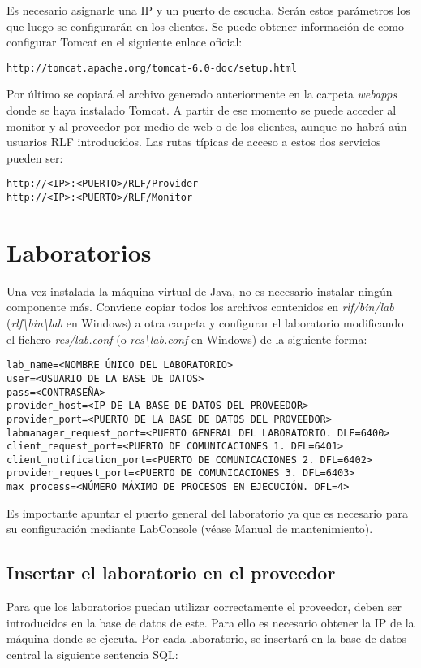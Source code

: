 Es necesario asignarle una IP y un puerto de escucha. Serán estos 
parámetros los que luego se configurarán en los clientes. Se puede 
obtener información de como configurar Tomcat en el siguiente enlace 
oficial:

\begin{verbatim}
http://tomcat.apache.org/tomcat-6.0-doc/setup.html
\end{verbatim}

Por último se copiará el archivo generado anteriormente en la carpeta 
\emph{webapps} donde se haya instalado Tomcat. A partir de ese momento 
se puede acceder al monitor y al proveedor por medio de web o de los 
clientes, aunque no habrá aún usuarios RLF introducidos. Las rutas 
típicas de acceso a estos dos servicios pueden ser:

\begin{verbatim}
http://<IP>:<PUERTO>/RLF/Provider
http://<IP>:<PUERTO>/RLF/Monitor
\end{verbatim}

\section*{Laboratorios}
Una vez instalada la máquina virtual de Java, no es necesario instalar 
ningún componente más. Conviene copiar todos los archivos contenidos en 
\emph{rlf/bin/lab} (\emph{rlf\textbackslash bin\textbackslash lab} en 
Windows) a otra carpeta y configurar el laboratorio modificando el 
fichero \emph{res/lab.conf} (o \emph{res\textbackslash lab.conf} en 
Windows) de la siguiente forma:

\begin{verbatim}
lab_name=<NOMBRE ÚNICO DEL LABORATORIO>
user=<USUARIO DE LA BASE DE DATOS>
pass=<CONTRASEÑA>
provider_host=<IP DE LA BASE DE DATOS DEL PROVEEDOR>
provider_port=<PUERTO DE LA BASE DE DATOS DEL PROVEEDOR>
labmanager_request_port=<PUERTO GENERAL DEL LABORATORIO. DLF=6400>
client_request_port=<PUERTO DE COMUNICACIONES 1. DFL=6401>
client_notification_port=<PUERTO DE COMUNICACIONES 2. DFL=6402>
provider_request_port=<PUERTO DE COMUNICACIONES 3. DFL=6403>
max_process=<NÚMERO MÁXIMO DE PROCESOS EN EJECUCIÓN. DFL=4>
\end{verbatim}

Es importante apuntar el puerto general del laboratorio ya que es 
necesario para su configuración mediante LabConsole (véase Manual de 
mantenimiento).

\subsection*{Insertar el laboratorio en el proveedor}
Para que los laboratorios puedan utilizar correctamente el proveedor, 
deben ser introducidos en la base de datos de este. Para ello es 
necesario obtener la IP de la máquina donde se ejecuta. Por cada 
laboratorio, se insertará en la base de datos central la siguiente 
sentencia SQL:

